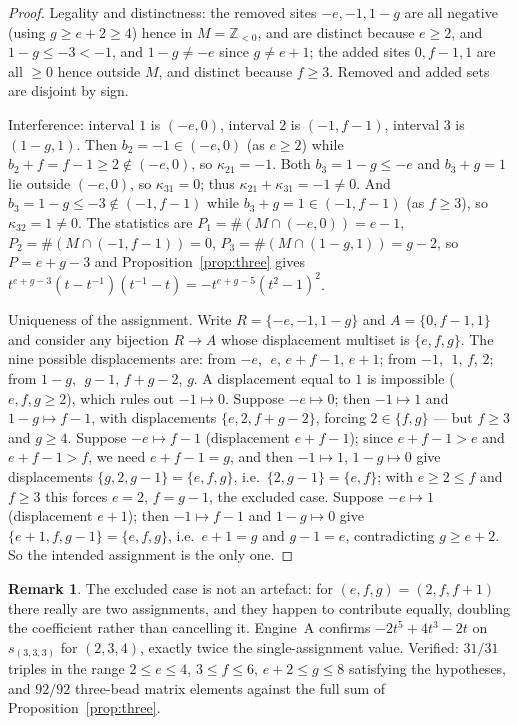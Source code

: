 \documentclass[11pt]{article}
\theoremstyle{definition}
\newtheorem{remark}[theorem]{Remark}
\newcommand{\Z}{\mathbb{Z}}
\begin{document}
\begin{proof}
Legality and distinctness: the removed sites $-e,-1,1-g$ are all negative (using
$g\ge e+2\ge4$) hence in $M=\Z_{<0}$, and are distinct because $e\ge2$, and
$1-g\le-3<-1$, and $1-g\ne-e$ since $g\ne e+1$; the added sites $0,f-1,1$ are all
$\ge0$ hence outside $M$, and distinct because $f\ge3$.  Removed and added sets are
disjoint by sign.

Interference: interval $1$ is $(-e,0)$, interval $2$ is $(-1,f-1)$, interval $3$ is
$(1-g,1)$.  Then $b_2=-1\in(-e,0)$ (as $e\ge2$) while $b_2+f=f-1\ge2\notin(-e,0)$, so
$\kappa_{21}=-1$.  Both $b_3=1-g\le-e$ and $b_3+g=1$ lie outside $(-e,0)$, so
$\kappa_{31}=0$; thus $\kappa_{21}+\kappa_{31}=-1\ne0$.  And $b_3=1-g\le-3\notin(-1,f-1)$
while $b_3+g=1\in(-1,f-1)$ (as $f\ge3$), so $\kappa_{32}=1\ne0$.  The statistics are
$P_1=\#(M\cap(-e,0))=e-1$, $P_2=\#(M\cap(-1,f-1))=0$, $P_3=\#(M\cap(1-g,1))=g-2$, so
$P=e+g-3$ and Proposition~\ref{prop:three} gives
$t^{e+g-3}(t-t^{-1})(t^{-1}-t)=-t^{e+g-5}(t^{2}-1)^{2}$.

Uniqueness of the assignment.  Write $R=\{-e,-1,1-g\}$ and $A=\{0,f-1,1\}$ and consider
any bijection $R\to A$ whose displacement multiset is $\{e,f,g\}$.  The nine possible
displacements are: from $-e$, $\;e$, $e+f-1$, $e+1$; from $-1$, $\;1$, $f$, $2$; from
$1-g$, $\;g-1$, $f+g-2$, $g$.  A displacement equal to $1$ is impossible ($e,f,g\ge2$),
which rules out $-1\mapsto0$.  Suppose $-e\mapsto0$; then $-1\mapsto1$ and
$1-g\mapsto f-1$, with displacements $\{e,2,f+g-2\}$, forcing $2\in\{f,g\}$ --- but
$f\ge3$ and $g\ge4$.  Suppose $-e\mapsto f-1$ (displacement $e+f-1$); since $e+f-1>e$ and
$e+f-1>f$, we need $e+f-1=g$, and then $-1\mapsto1$, $1-g\mapsto0$ give displacements
$\{g,2,g-1\}=\{e,f,g\}$, i.e.\ $\{2,g-1\}=\{e,f\}$; with $e\ge2\le f$ and $f\ge3$ this
forces $e=2$, $f=g-1$, the excluded case.  Suppose $-e\mapsto1$ (displacement $e+1$);
then $-1\mapsto f-1$ and $1-g\mapsto0$ give $\{e+1,f,g-1\}=\{e,f,g\}$, i.e.\ $e+1=g$ and
$g-1=e$, contradicting $g\ge e+2$.  So the intended assignment is the only one.
\end{proof}

\begin{remark}
The excluded case is not an artefact: for $(e,f,g)=(2,f,f+1)$ there really are two
assignments, and they happen to contribute equally, doubling the coefficient rather than
cancelling it.  Engine~A confirms $-2t^{5}+4t^{3}-2t$ on $s_{(3,3,3)}$ for $(2,3,4)$,
exactly twice the single-assignment value.  Verified: $31/31$ triples in the range
$2\le e\le4$, $3\le f\le6$, $e+2\le g\le8$ satisfying the hypotheses, and $92/92$
three-bead matrix elements against the full sum of Proposition~\ref{prop:three}.
\end{remark}
\end{document}
